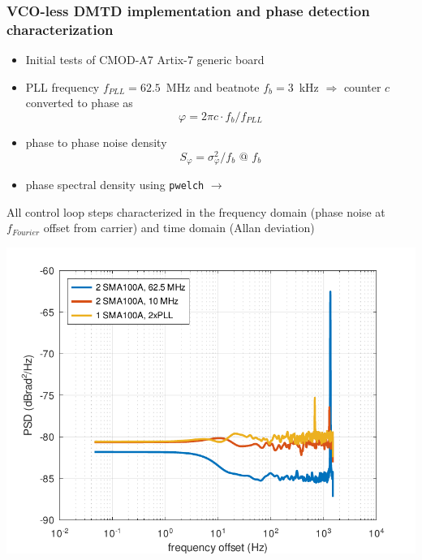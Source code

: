 \documentclass[compress,10pt,aspectratio=169]{beamer}
\begin{document}
\begin{frame}[fragile]\frametitle{VCO-less DMTD implementation and phase detection characterization}

\begin{minipage}[t]{1.06\linewidth}
\begin{minipage}{.49\linewidth}



\begin{itemize}
\item Initial tests of CMOD-A7 Artix-7 generic board
\item PLL frequency $f_{PLL}=62.5$~MHz and beatnote $f_b=3$~kHz $\Rightarrow$ counter $c$ converted
to phase as $$\varphi=2\pi c\cdot f_b/f_{PLL}$$
\item phase to phase noise density $$S_\varphi=\sigma^2_\varphi/f_b\mbox{ @ }f_b$$
\item phase spectral density using {\tt pwelch} $\longrightarrow$
\end{itemize}
\end{minipage}
\begin{minipage}{.49\linewidth}
\vspace{0.6cm}
All control loop steps characterized in the frequency domain (phase noise
at $f_{Fourier}$ offset from carrier) and time domain (Allan deviation)

\includegraphics[width=1.05\linewidth]{62p5MHz.pdf}
\end{minipage}
\end{minipage}
\end{frame}
\end{document}

